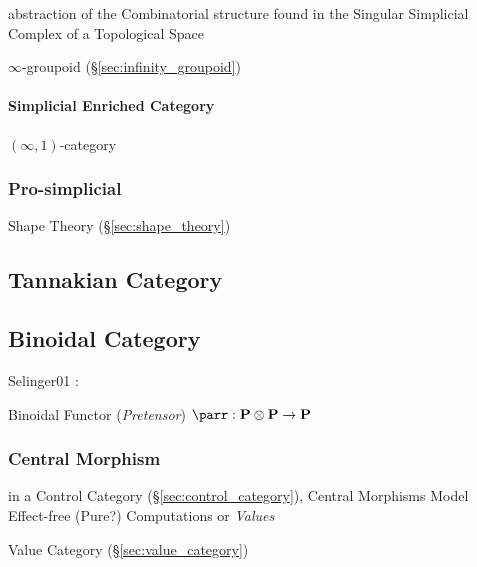 abstraction of the Combinatorial structure found in the Singular
Simplicial Complex of a Topological Space %

$\infty$-groupoid (\S\ref{sec:infinity_groupoid})



\paragraph{Simplicial Enriched Category}\hfill
\label{sec:simplicial_enriched}

$(\infty,1)$-category %



\subsubsection{Pro-simplicial}\label{sec:pro_simplicial}

Shape Theory (\S\ref{sec:shape_theory})



\subsection{Tannakian Category}\label{sec:tannakian_category}

\subsection{Binoidal Category}\label{sec:binoidal_category}

Selinger01 \cite{selinger01}:

Binoidal Functor (\emph{Pretensor}) $\parr : \cat{P} \otimes \cat{P}
\rightarrow \cat{P}$



\subsubsection{Central Morphism}\label{sec:central_morphism}

in a Control Category (\S\ref{sec:control_category}), Central
Morphisms Model Effect-free (Pure?) Computations or \emph{Values}

Value Category (\S\ref{sec:value_category})


